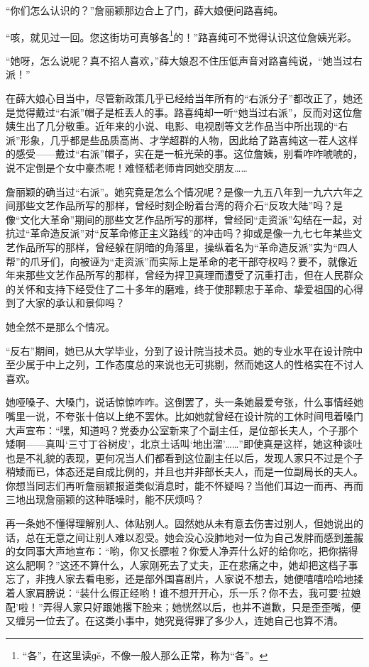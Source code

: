 \par “你们怎么认识的？”詹丽颖那边合上了门，薛大娘便问路喜纯。
\par “咳，就见过一回。您这街坊可真够各\footnote{“各”，在这里读ɡě，不像一般人那么正常，称为“各”。}的！”路喜纯可不觉得认识这位詹姨光彩。
\par “她呀，怎么说呢？真不招人喜欢，”薛大娘忍不住压低声音对路喜纯说，“她当过右派！”
\par 在薛大娘心目当中，尽管新政策几乎已经给当年所有的“右派分子”都改正了，她还是觉得戴过“右派”帽子是桩丢人的事。路喜纯却一听“她当过右派”，反而对这位詹姨生出了几分敬重。近年来的小说、电影、电视剧等文艺作品当中所出现的“右派”形象，几乎都是些品质高尚、才学超群的人物，因此给了路喜纯这一茬人这样的感受——戴过“右派”帽子，实在是一桩光荣的事。这位詹姨，别看咋咋唬唬的，说不定倒是个女中豪杰呢！难怪嵇老师肯同她交朋友……
\par 詹丽颖的确当过“右派”。她究竟是怎么个情况呢？是像一九五八年到一九六六年之间那些文艺作品所写的那样，曾经时刻企盼着台湾的蒋介石“反攻大陆”吗？是像“文化大革命”期间的那些文艺作品所写的那样，曾经同“走资派”勾结在一起，对抗过“革命造反派”对“反革命修正主义路线”的冲击吗？抑或是像一九七七年某些文艺作品所写的那样，曾经躲在阴暗的角落里，操纵着名为“革命造反派”实为“四人帮”的爪牙们，向被诬为“走资派”而实际上是革命的老干部夺权吗？要不，就像近年来那些文艺作品所写的那样，曾经为捍卫真理而遭受了沉重打击，但在人民群众的关怀和支持下经受住了二十多年的磨难，终于使那颗忠于革命、挚爱祖国的心得到了大家的承认和景仰吗？
\par 她全然不是那么个情况。
\par “反右”期间，她已从大学毕业，分到了设计院当技术员。她的专业水平在设计院中至少属于中上之列，工作态度总的来说也无可挑剔，然而她这人的性格实在不讨人喜欢。
\par 她哑嗓子、大嗓门，说话惊惊咋咋。这倒罢了，头一条她最爱夸张，什么事情经她嘴里一说，不夸张十倍以上绝不罢休。比如她就曾经在设计院的工休时间甩着嗓门大声宣布：“嘿，知道吗？党委办公室新来了个副主任，是位部长夫人，个子那个矮啊——真叫‘三寸丁谷树皮’，北京土话叫‘地出溜’……”即使真是这样，她这种谈吐也是不礼貌的表现，更何况当人们都看到这位副主任以后，发现人家只不过是个子稍矮而已，体态还是自成比例的，并且也并非部长夫人，而是一位副局长的夫人。你想当同志们再听詹丽颖报道类似消息时，能不怀疑吗？当他们耳边一而再、再而三地出现詹丽颖的这种聒噪时，能不厌烦吗？
\par 再一条她不懂得理解别人、体贴别人。固然她从未有意去伤害过别人，但她说出的话，总在无意之间让别人难以忍受。她会没心没肺地对一位为自己发胖而感到羞赧的女同事大声地宣布：“哟，你又长膘啦？你爱人净弄什么好的给你吃，把你揣得这么肥啊？”这还不算什么，人家刚死去了丈夫，正在悲痛之中，她却把这档子事忘了，非拽人家去看电影，还是部外国喜剧片，人家说不想去，她便嘻嘻哈哈地揉着人家肩膀说：“装什么假正经哟！谁不想开开心，乐一乐？你不去，我可要‘拉娘配’啦！”弄得人家只好跟她撂下脸来；她恍然以后，也并不道歉，只是歪歪嘴，便又缠另一位去了。在这类小事中，她究竟得罪了多少人，连她自己也算不清。
